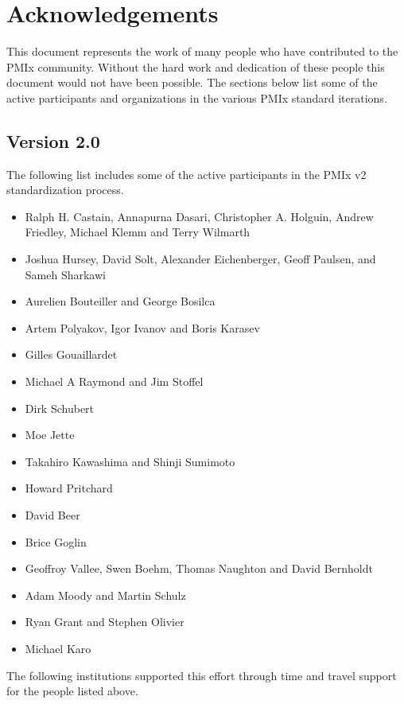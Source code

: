 \chapter{Acknowledgements}
\label{chap:acknowledgements}

This document represents the work of many people who have contributed to the PMIx community.
Without the hard work and dedication of these people this document would not have been possible.
The sections below list some of the active participants and organizations in the various PMIx standard iterations.

\section{Version 2.0}

The following list includes some of the active participants in the PMIx v2 standardization process.

\begin{itemize}
\item Ralph H. Castain, Annapurna Dasari, Christopher A. Holguin, Andrew Friedley, Michael Klemm and Terry Wilmarth
\item Joshua Hursey, David Solt, Alexander Eichenberger, Geoff Paulsen, and Sameh Sharkawi
\item Aurelien Bouteiller and George Bosilca
\item Artem Polyakov, Igor Ivanov and Boris Karasev
\item Gilles Gouaillardet
\item Michael A Raymond and Jim Stoffel
\item Dirk Schubert
\item Moe Jette
\item Takahiro Kawashima and Shinji Sumimoto
\item Howard Pritchard
\item David Beer
\item Brice Goglin
\item Geoffroy Vallee, Swen Boehm, Thomas Naughton and David Bernholdt
\item Adam Moody and Martin Schulz
\item Ryan Grant and Stephen Olivier
\item Michael Karo
\end{itemize}

The following institutions supported this effort through time and travel support for the people listed above.

